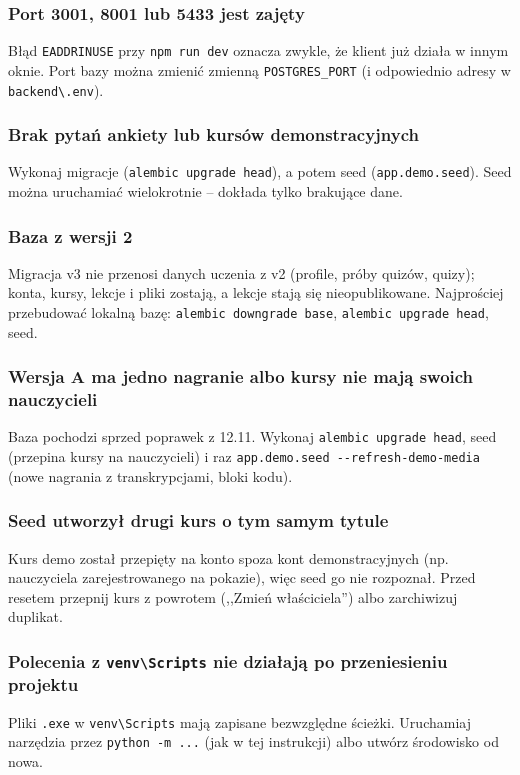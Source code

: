 \subsubsection{Port 3001, 8001 lub 5433 jest zajęty}
Błąd \texttt{EADDRINUSE} przy \texttt{npm run dev} oznacza zwykle, że klient już działa w innym oknie. Port bazy można zmienić zmienną \texttt{POSTGRES\_PORT} (i odpowiednio adresy w \texttt{backend\textbackslash.env}).

\subsubsection{Brak pytań ankiety lub kursów demonstracyjnych}
Wykonaj migracje (\texttt{alembic upgrade head}), a potem seed (\texttt{app.demo.seed}). Seed można uruchamiać wielokrotnie -- dokłada tylko brakujące dane.

\subsubsection{Baza z wersji 2}
Migracja v3 nie przenosi danych uczenia z v2 (profile, próby quizów, quizy); konta, kursy, lekcje i pliki zostają, a lekcje stają się nieopublikowane. Najprościej przebudować lokalną bazę: \texttt{alembic downgrade base}, \texttt{alembic upgrade head}, seed.

\subsubsection{Wersja A ma jedno nagranie albo kursy nie mają swoich nauczycieli}
Baza pochodzi sprzed poprawek z 12.11. Wykonaj \texttt{alembic upgrade head}, seed (przepina kursy na nauczycieli) i raz \texttt{app.demo.seed -{}-refresh-demo-media} (nowe nagrania z transkrypcjami, bloki kodu).

\subsubsection{Seed utworzył drugi kurs o tym samym tytule}
Kurs demo został przepięty na konto spoza kont demonstracyjnych (np. nauczyciela zarejestrowanego na pokazie), więc seed go nie rozpoznał. Przed resetem przepnij kurs z powrotem (,,Zmień właściciela'') albo zarchiwizuj duplikat.

\subsubsection{Polecenia z \texttt{venv\textbackslash Scripts} nie działają po przeniesieniu projektu}
Pliki \texttt{.exe} w \texttt{venv\textbackslash Scripts} mają zapisane bezwzględne ścieżki. Uruchamiaj narzędzia przez \texttt{python -m ...} (jak w tej instrukcji) albo utwórz środowisko od nowa.

